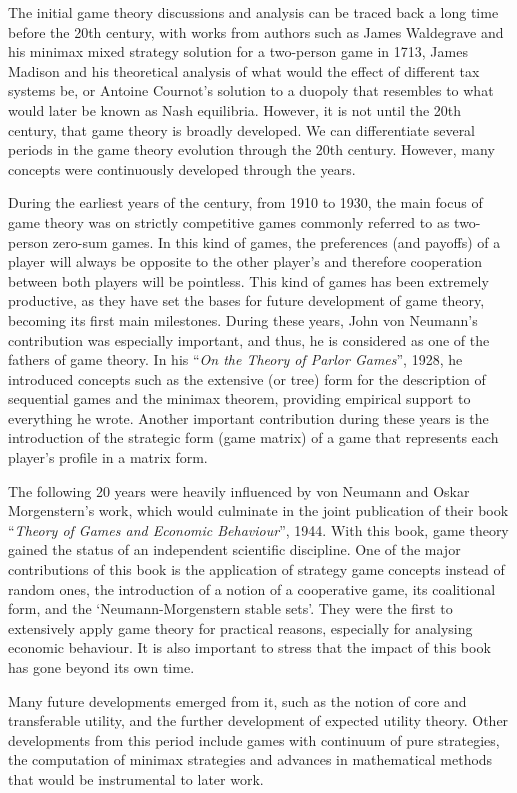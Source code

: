 \documentclass[]{report}
\begin{document}
The initial game theory discussions and analysis can be traced back a long time before the 20th century, with works from authors such as James Waldegrave and his minimax mixed strategy solution for a two-person game in 1713, James Madison and his theoretical analysis of what would the effect of different tax systems be, or Antoine Cournot’s solution to a duopoly that resembles to what would later be known as Nash equilibria. However, it is not until the 20th century, that game theory is broadly developed. We can differentiate several periods in the game theory evolution through the 20th century. However, many concepts were continuously developed through the years.

During the earliest years of the century, from 1910 to 1930, the main focus of game theory was on  strictly competitive games commonly referred to as two-person zero-sum games. In this kind of games, the preferences (and payoffs) of a player will always be opposite to the other player’s and therefore cooperation between both players will be pointless. This kind of games has been extremely productive, as they have set the bases for future development of game theory, becoming its first main milestones. During these years, John von Neumann’s contribution was especially important, and thus, he is considered as one of the fathers of game theory.  In his “\textit{On the Theory of Parlor Games}”, 1928, he introduced concepts such as the extensive (or tree) form for the description of sequential games and the minimax theorem, providing empirical support to everything he wrote. Another important contribution during these years is the introduction of the strategic form (game matrix) of a game that represents each player’s profile in a matrix form.


The following 20 years were heavily influenced by von Neumann and Oskar Morgenstern’s work, which would culminate in the joint publication of their book “\textit{Theory of Games and Economic Behaviour}”, 1944.  With this book, game theory gained the status of an independent scientific discipline. One of the major contributions of this book is the application of strategy game concepts instead of random ones, the introduction of a notion of a cooperative game, its coalitional form, and the ‘Neumann-Morgenstern stable sets’. They were the first to extensively apply game theory for practical reasons, especially for analysing economic behaviour. It is also important to stress that the impact of this book has gone beyond its own time.  

Many future developments emerged from it, such as the notion of core and transferable utility, and the further development of expected utility theory. Other developments from this period include games with continuum of pure strategies, the computation of minimax strategies and advances in mathematical methods that would be instrumental to later work.
\end{document}
